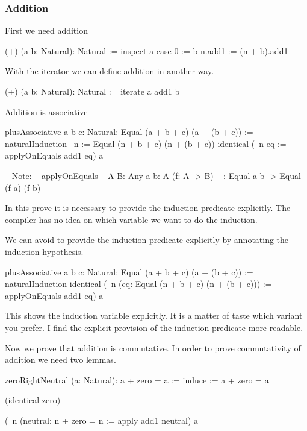 \subsubsection{Addition}


First we need addition
\begin{alba}
  (+) (a b: Natural): Natural :=
    inspect a case
      0 :=
        b
      n.add1 :=
        (n + b).add1
\end{alba}

With the iterator we can define addition in another way.

\begin{alba}
    (+) (a b: Natural): Natural :=
        iterate a add1 b
\end{alba}


Addition is associative
%
\begin{alba}
    plusAssociative {a b c: Natural}: Equal (a + b + c) (a + (b + c)) :=
        naturalInduction
            {\ n := Equal (n + b + c) (n + (b + c))}
            identical
            (\ {n} eq := applyOnEquals add1 eq)
            {a}

    -- Note:
    -- applyOnEquals
    --      {A B: Any} {a b: A} (f: A -> B)
    --      : Equal a b -> Equal (f a) (f b)
\end{alba}

In this prove it is necessary to provide the induction predicate explicitly. The
compiler has no idea on which variable we want to do the induction.

We can avoid to provide the induction predicate explicitly by annotating the
induction hypothesis.

\begin{alba}
    plusAssociative {a b c: Natural}: Equal (a + b + c) (a + (b + c)) :=
        naturalInduction
            identical
            (\ {n} (eq: Equal (n + b + c) (n + (b + c))) :=
                applyOnEquals add1 eq)
            {a}
\end{alba}
%
This shows the induction variable explicitly. It is a matter of taste which
variant you prefer. I find the explicit provision of the induction predicate
more readable.


Now we prove that addition is commutative. In order to prove commutativity of
addition we need two lemmas.

\begin{alba}
    zeroRightNeutral (a: Natural): a + zero = a :=
        induce
            {\a := a + zero = a}

            (identical zero)

            (\ n (neutral: n + zero = n :=
                apply add1 neutral)
            a
\end{alba}




